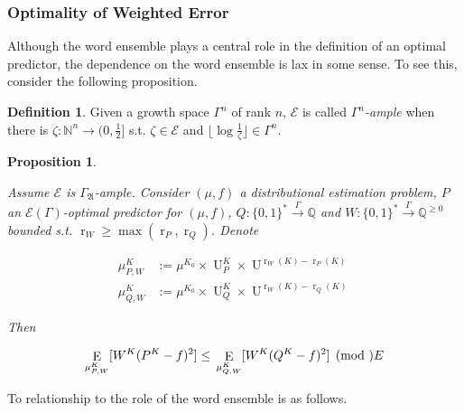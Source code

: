 \documentclass{article}
\numberwithin{equation}{section}
\theoremstyle{definition}
\newtheorem{definition}{Definition}[section]
\theoremstyle{plain}
\newtheorem{proposition}{Proposition}[section]
\newcommand{\Bool}{\{0,1\}}
\newcommand{\Words}{{\Bool^*}}
\DeclareMathOperator{\E}{E}
\DeclareMathOperator{\R}{r}
\DeclareMathOperator{\Un}{U}
\newcommand{\Nats}{\mathbb{N}}
\newcommand{\Rats}{\mathbb{Q}}
\newcommand{\Floor}[1]{\lfloor #1 \rfloor}
\newcommand{\GrowA}{\Gamma_{\mathfrak{A}}}
\newcommand{\Fall}{\mathcal{E}}
\newcommand{\EG}{\Fall(\Gamma)}
\newcommand{\Scheme}{\xrightarrow{\Gamma}}
\begin{document}
\subsubsection{Optimality of Weighted Error}

Although the word ensemble plays a central role in the definition of an optimal predictor, the dependence on the word ensemble is lax in some sense. To see this, consider the following proposition.

\begin{definition}

Given a growth space $\Gamma^n$ of rank $n$, $\Fall$ is called \emph{$\Gamma^n$-ample} when there is $\zeta: \Nats^n \rightarrow (0,\frac{1}{2}]$ s.t.  $\zeta \in \Fall$ and $\Floor{\log \frac{1}{\zeta}} \in \Gamma^n$.

\end{definition}

\begin{proposition}
\label{prp:weight}

Assume $\Fall$ is $\GrowA$-ample. Consider $(\mu,f)$ a distributional estimation problem, $P$ an $\EG$-optimal predictor for $(\mu,f)$, $Q: \Words \Scheme \Rats$ and ${W: \Words \Scheme \Rats^{\geq 0}}$ bounded s.t. ${\R_W \geq \max(\R_P, \R_Q)}$. Denote 

\begin{align*}
\mu^{K}_{P,W} &:=\mu^{K_0} \times \Un_P^{K} \times \Un^{\R_W(K)-\R_P(K)} \\
\mu^{K}_{Q,W} &:=\mu^{K_0} \times \Un_Q^{K} \times \Un^{\R_W(K)-\R_Q(K)}
\end{align*}

Then

\begin{equation}
\E_{\mu^{K}_{P,W}}[W^{K}(P^{K} - f)^2] \leq \\ \E_{\mu^{K}_{Q,W}}[W^{K}(Q^{K} - f)^2] \pmod \Fall
\end{equation}

\end{proposition}

To relationship to the role of the word ensemble is as follows.
\end{document}
